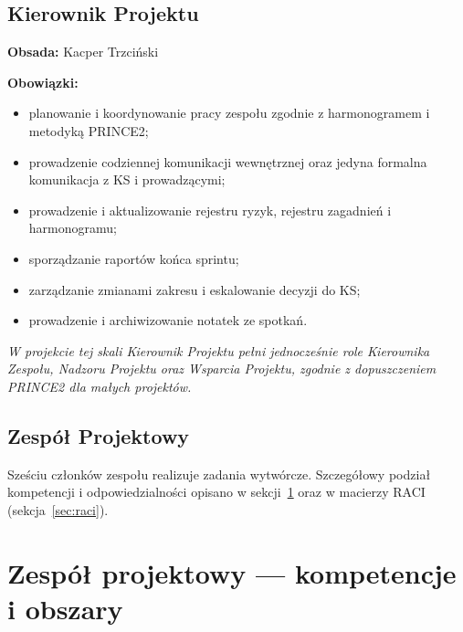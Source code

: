 \documentclass[11pt,a4paper]{article}
\begin{document}

\subsection{Kierownik Projektu}

\textbf{Obsada:} Kacper Trzciński

\textbf{Obowiązki:}
\begin{itemize}[noitemsep]
    \item planowanie i koordynowanie pracy zespołu zgodnie z harmonogramem i metodyką PRINCE2;
    \item prowadzenie codziennej komunikacji wewnętrznej oraz jedyna formalna komunikacja z KS i prowadzącymi;
    \item prowadzenie i aktualizowanie rejestru ryzyk, rejestru zagadnień i harmonogramu;
    \item sporządzanie raportów końca sprintu;
    \item zarządzanie zmianami zakresu i eskalowanie decyzji do KS;
    \item prowadzenie i archiwizowanie notatek ze spotkań.
\end{itemize}

\textit{W projekcie tej skali Kierownik Projektu pełni jednocześnie role Kierownika Zespołu, Nadzoru Projektu oraz Wsparcia Projektu, zgodnie z dopuszczeniem PRINCE2 dla małych projektów.}

\subsection{Zespół Projektowy}

Sześciu członków zespołu realizuje zadania wytwórcze. Szczegółowy podział kompetencji i odpowiedzialności opisano w sekcji~\ref{sec:zespol} oraz w macierzy RACI (sekcja~\ref{sec:raci}).

\section{Zespół projektowy --- kompetencje i obszary}
\label{sec:zespol}
\end{document}
